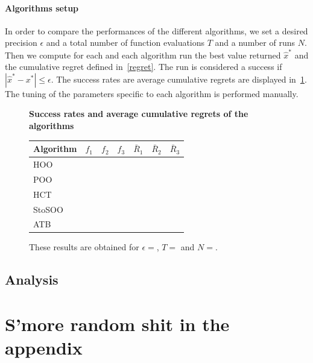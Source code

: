 \documentclass[a4paper,10pt]{article}
\begin{document}
\paragraph{Algorithms setup}
In order to compare the performances of the different algorithms, we set a desired precision $\epsilon$ and a total number of function evaluations $T$ and a number of runs $N$. Then we compute for each and each algorithm run the best value returned $\widehat{x}^*$ and the cumulative regret defined in~\ref{regret}. The run is considered a success if $|\widehat{x}^*-x^*|\le \epsilon$. The success rates are average cumulative regrets are displayed in~\ref{restab}. The tuning of the parameters specific to each algorithm is performed manually.

\begin{figure}
\label{restab}
\centering
\textbf{Success rates and average cumulative regrets of the algorithms}
\begin{tabular}{|l|c|c|c|c|c|c|}
\hline
Algorithm & $f_1$ & $f_2$ & $f_3$ & $\bar{R}_1$ & $\bar{R}_2$ & $\bar{R}_3$ \\
\hline
HOO & & & & & &\\
POO & & & & & &\\
HCT & & & & & &\\
StoSOO & & & & & &\\
ATB & & & & & &\\
\hline
\end{tabular}
\caption{These results are obtained for $\epsilon=$, $T=$ and $N=$.}
\end{figure}

\subsection{Analysis}

\appendix
\section{S'more random shit in the appendix}
\end{document}
